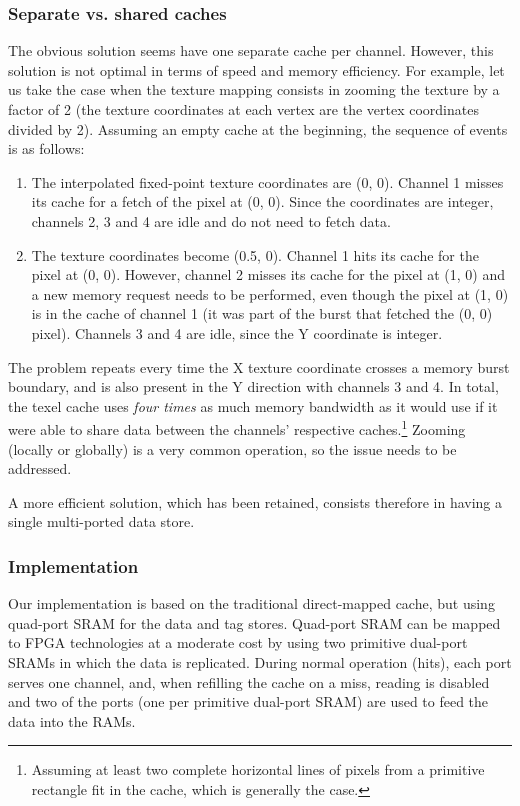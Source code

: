 \documentclass[a4paper,11pt]{kthesis}
\begin{document}
\subsubsection{Separate vs. shared caches}
The obvious solution seems have one separate cache per channel. However, this solution is not optimal in terms of speed and memory efficiency. For example, let us take the case when the texture mapping consists in zooming the texture by a factor of 2 (the texture coordinates at each vertex are the vertex coordinates divided by 2). Assuming an empty cache at the beginning, the sequence of events is as follows:
\begin{enumerate}
\item The interpolated fixed-point texture coordinates are (0, 0). Channel 1 misses its cache for a fetch of the pixel at (0, 0). Since the coordinates are integer, channels 2, 3 and 4 are idle and do not need to fetch data.
\item The texture coordinates become (0.5, 0). Channel 1 hits its cache for the pixel at (0, 0). However, channel 2 misses its cache for the pixel at (1, 0) and a new memory request needs to be performed, even though the pixel at (1, 0) is in the cache of channel 1 (it was part of the burst that fetched the (0, 0) pixel). Channels 3 and 4 are idle, since the Y coordinate is integer.
\end{enumerate}
The problem repeats every time the X texture coordinate crosses a memory burst boundary, and is also present in the Y direction with channels 3 and 4. In total, the texel cache uses \textit{four times} as much memory bandwidth as it would use if it were able to share data between the channels' respective caches.\footnote{Assuming at least two complete horizontal lines of pixels from a primitive rectangle fit in the cache, which is generally the case.} Zooming (locally or globally) is a very common operation, so the issue needs to be addressed.

A more efficient solution, which has been retained, consists therefore in having a single multi-ported data store.

\subsubsection{Implementation}
Our implementation is based on the traditional direct-mapped cache, but using quad-port SRAM for the data and tag stores. Quad-port SRAM can be mapped to FPGA technologies at a moderate cost by using two primitive dual-port SRAMs in which the data is replicated. During normal operation (hits), each port serves one channel, and, when refilling the cache on a miss, reading is disabled and two of the ports (one per primitive dual-port SRAM) are used to feed the data into the RAMs.
\end{document}
